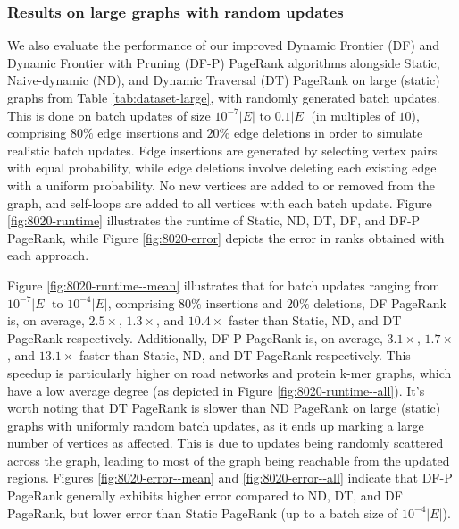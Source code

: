 


\subsubsection{Results on large graphs with random updates}

We also evaluate the performance of our improved Dynamic Frontier (DF) and Dynamic Frontier with Pruning (DF-P) PageRank algorithms alongside Static, Naive-dynamic (ND), and Dynamic Traversal (DT) PageRank on large (static) graphs from Table \ref{tab:dataset-large}, with randomly generated batch updates. This is done on batch updates of size $10^{-7}|E|$ to $0.1|E|$ (in multiples of $10$), comprising $80\%$ edge insertions and $20\%$ edge deletions in order to simulate realistic batch updates. Edge insertions are generated by selecting vertex pairs with equal probability, while edge deletions involve deleting each existing edge with a uniform probability. No new vertices are added to or removed from the graph, and self-loops are added to all vertices with each batch update. Figure \ref{fig:8020-runtime} illustrates the runtime of Static, ND, DT, DF, and DF-P PageRank, while Figure \ref{fig:8020-error} depicts the error in ranks obtained with each approach.




Figure \ref{fig:8020-runtime--mean} illustrates that for batch updates ranging from $10^{-7}|E|$ to $10^{-4}|E|$, comprising $80\%$ insertions and $20\%$ deletions, DF PageRank is, on average, $2.5\times$, $1.3\times$, and $10.4\times$ faster than Static, ND, and DT PageRank respectively. Additionally, DF-P PageRank is, on average, $3.1\times$, $1.7\times$, and $13.1\times$ faster than Static, ND, and DT PageRank respectively. This speedup is particularly higher on road networks and protein k-mer graphs, which have a low average degree (as depicted in Figure \ref{fig:8020-runtime--all}). It's worth noting that DT PageRank is slower than ND PageRank \cite{sahu2024incrementally} on large (static) graphs with uniformly random batch updates, as it ends up marking a large number of vertices as affected. This is due to updates being randomly scattered across the graph, leading to most of the graph being reachable from the updated regions. Figures \ref{fig:8020-error--mean} and \ref{fig:8020-error--all} indicate that DF-P PageRank generally exhibits higher error compared to ND, DT, and DF PageRank, but lower error than Static PageRank (up to a batch size of $10^{-4}|E|$).

